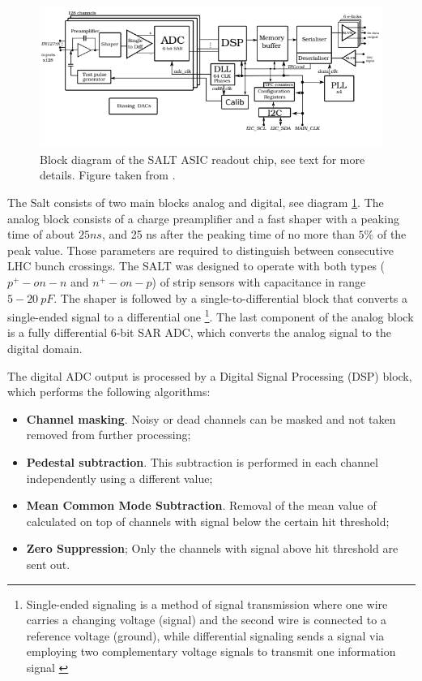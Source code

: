\begin{figure}[ht!]
\centering
\includegraphics{figures/SALT_2.PNG}
\caption{Block diagram of the SALT ASIC readout chip, see text for more details. Figure taken from \cite{SALT}.
\label{fig:SALT}}
\end{figure}


The Salt consists of two main blocks analog and digital, see diagram \ref{fig:SALT}. The analog block consists of a charge preamplifier and a fast shaper with a peaking time of about $25 ns$, and 25 ns after the peaking time of no more than $5\%$ of the peak value.  Those parameters are required to distinguish between consecutive LHC bunch crossings. The SALT was designed to operate with both types ($p^{+}-on-n$ and $n^{+}-on-p$) of strip sensors with capacitance in range $5-20~ pF$. 
The shaper is followed by a single-to-differential block that converts a single-ended signal to a differential one \footnote{Single-ended signaling is a method of signal transmission where one wire carries a changing voltage (signal) and the second wire is connected to a reference voltage (ground), while differential signaling sends a signal via employing two complementary voltage signals to transmit one information signal \cite{signals}}. The last component of the analog block is a fully differential 6-bit SAR ADC, which converts the analog signal to the digital domain. 

The digital ADC output is processed by a Digital Signal Processing (DSP) block, which performs the following algorithms: 

\begin{itemize}
    \item \textbf{Channel masking}. Noisy or dead channels can be masked and not taken removed from further processing; 
    \item \textbf{Pedestal subtraction}. This subtraction is performed in each channel independently using a different value;
    \item \textbf{Mean Common Mode Subtraction}. Removal of the mean value of calculated on top of channels with signal below the certain hit threshold; 
    \item \textbf{Zero Suppression}; Only the channels with signal above hit threshold are sent out.
\end{itemize}

